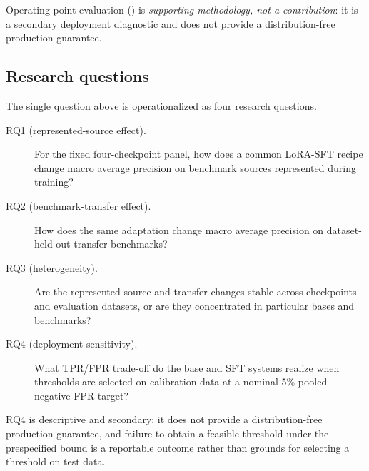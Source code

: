 \documentclass[11pt]{article}
\begin{document}
Operating-point evaluation () is \emph{supporting methodology, not a contribution}: it is a secondary deployment diagnostic and does not provide a distribution-free production guarantee.

\subsection{Research questions}
\label{sec:rqs}

The single question above is operationalized as four research questions.

\begin{description}
  \item[RQ1 (represented-source effect).] For the fixed four-checkpoint panel, how does a common LoRA-SFT recipe change macro average precision on benchmark sources represented during training?
  \item[RQ2 (benchmark-transfer effect).] How does the same adaptation change macro average precision on dataset-held-out transfer benchmarks?
  \item[RQ3 (heterogeneity).] Are the represented-source and transfer changes stable across checkpoints and evaluation datasets, or are they concentrated in particular bases and benchmarks?
  \item[RQ4 (deployment sensitivity).] What TPR/FPR trade-off do the base and SFT systems realize when thresholds are selected on calibration data at a nominal 5\% pooled-negative FPR target?
\end{description}

RQ4 is descriptive and secondary: it does not provide a distribution-free production guarantee, and failure to obtain a feasible threshold under the prespecified bound is a reportable outcome rather than grounds for selecting a threshold on test data.
\end{document}
